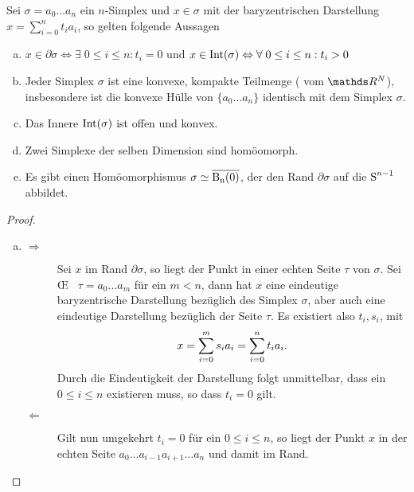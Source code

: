 \begin{Satz}\label{satz:simp}
  \normalfont Sei $\sigma = a_0 \ldots a_n $ ein $n$-Simplex und
  $x \in \sigma$ mit der baryzentrischen Darstellung
  $x=\sum\limits_{i=0}^n t_i a_i$, so gelten folgende Aussagen
  \begin{enumerate}[(a)]
  \item
    $x \in \partial\sigma \Leftrightarrow \exists \; 0 \leq i \leq n :
    t_i = 0$ und \label{satz:a}
    $x \in \Int(\sigma) \Leftrightarrow \forall \; 0 \leq i \leq n :
    t_i > 0$
  \item Jeder Simplex $\sigma$ ist eine konvexe, kompakte Teilmenge (
    vom $\R^N$), insbesondere ist die konvexe Hülle von
    $\{ a_0 \ldots a_n \}$ identisch mit dem Simplex $\sigma$.
  \item Das Innere $\Int(\sigma)$ ist offen und konvex.
  \item Zwei Simplexe der selben Dimension sind homöomorph.
  \item Es gibt einen Homöomorphismus $\sigma \simeq \Bn$, der den
    Rand $\partial\sigma$ auf die $\Sp^{n-1}$ abbildet.
  \end{enumerate}
  \begin{proof}
    \begin{enumerate}[(a):]
    \item
      \begin{description}
      \item[\glqq $\Rightarrow$\grqq] Sei $x$ im Rand
        $\partial\sigma$, so liegt der Punkt in einer echten Seite
        $\tau$ von $\sigma$. Sei \OE~ $\tau = a_0 \ldots a_m$ für ein
        $m < n$, dann hat $x$ eine eindeutige baryzentrische
        Darstellung bezüglich des Simplex $\sigma$, aber auch eine
        eindeutige Darstellung bezüglich der Seite $\tau$. Es
        existiert also $t_i,s_i$, mit
        \begin{gather*}
          x = \sp{0}{m} s_i a_i = \sp{0}{n} t_i a_i .
        \end{gather*}
        Durch die Eindeutigkeit der Darstellung folgt unmittelbar,
        dass ein $0 \leq i \leq n$ existieren muss, so dass $t_i = 0$
        gilt.
      \item[\glqq $\Leftarrow$ \grqq] Gilt nun umgekehrt $t_i = 0$ für
        ein $0 \leq i \leq n$, so liegt der Punkt $x$ in der echten Seite
        $a_0 \ldots a_{i-1} a_{i+1} \ldots a_n$ und damit im Rand.
      \end{description}


\end{enumerate}
\end{proof}
\end{Satz}
